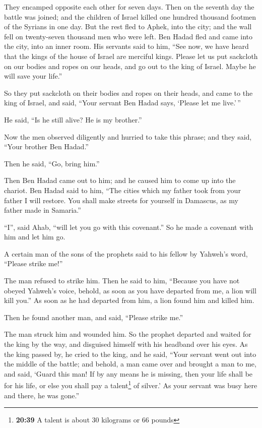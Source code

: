  They encamped opposite each other for seven days. Then
on the seventh day the battle was joined; and the children of Israel
killed one hundred thousand footmen of the Syrians in one day.
 But the rest fled to Aphek, into the city; and the wall
fell on twenty-seven thousand men who were left. Ben Hadad fled and came
into the city, into an inner room.  His servants said to
him, ``See now, we have heard that the kings of the house of Israel are
merciful kings. Please let us put sackcloth on our bodies and ropes on
our heads, and go out to the king of Israel. Maybe he will save your
life.''

 So they put sackcloth on their bodies and ropes on their
heads, and came to the king of Israel, and said, ``Your servant Ben
Hadad says, `Please let me live.'\,''

He said, ``Is he still alive? He is my brother.''

 Now the men observed diligently and hurried to take this
phrase; and they said, ``Your brother Ben Hadad.''

Then he said, ``Go, bring him.''

Then Ben Hadad came out to him; and he caused him to come up into the
chariot.  Ben Hadad said to him, ``The cities which my
father took from your father I will restore. You shall make streets for
yourself in Damascus, as my father made in Samaria.''

``I'', said Ahab, ``will let you go with this covenant.'' So he made a
covenant with him and let him go.

 A certain man of the sons of the prophets said to his
fellow by Yahweh's word, ``Please strike me!''

The man refused to strike him.  Then he said to him,
``Because you have not obeyed Yahweh's voice, behold, as soon as you
have departed from me, a lion will kill you.'' As soon as he had
departed from him, a lion found him and killed him.

 Then he found another man, and said, ``Please strike
me.''

The man struck him and wounded him.  So the prophet
departed and waited for the king by the way, and disguised himself with
his headband over his eyes.  As the king passed by, he
cried to the king, and he said, ``Your servant went out into the middle
of the battle; and behold, a man came over and brought a man to me, and
said, `Guard this man! If by any means he is missing, then your life
shall be for his life, or else you shall pay a talent\footnote{\textbf{20:39}
  A talent is about 30 kilograms or 66 pounds} of silver.'
 As your servant was busy here and there, he was gone.''

